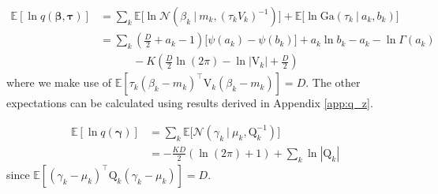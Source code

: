 \documentclass[twoside,11pt]{article}
\newcommand\given[1][]{\:#1\vert\:}
\newcommand{\transpose}[1]{#1^{\intercal}}
\newcommand{\ksum}{\sum_{k}}
\newcommand{\boldbeta}{\boldsymbol\beta}
\newcommand{\boldgamma}{\boldsymbol\gamma}
\newcommand{\boldtau}{\boldsymbol\tau}
\newcommand{\E}{\mathbb{E}}
\begin{document}
\begin{equation} \label{eq:e6_deriv} %
\begin{split}
	\E[\ln q(\boldbeta, \boldtau)] &= \ksum \E \Big[ \ln \mathcal{N} \left( \beta_k \given m_k, (\tau_k V_k)^{-1}\right)\Big] + \E\Big[\ln \mathrm{Ga} \left( \tau_k \given a_k, b_k \right)\Big] \\
	&= \ksum \left( \frac{D}{2} + a_k - 1 \right) \big[\psi(a_k) - \psi(b_k) \big] + a_k \ln b_k - a_k - \ln \Gamma(a_k)\\
	& \quad \quad \quad -K \left( \frac{D}{2} \ln(2\pi) - \ln |\mathrm{V}_{k}| + \frac{D}{2}\right)
\end{split}
\end{equation}
where we make use of $\E[\tau_k \transpose{(\beta_k - m_k)}\mathrm{V}_{k}(\beta_k - m_k)] = D$. The other expectations can be calculated using results derived in Appendix \ref{app:q_z}.

\begin{equation} \label{eq:e7_deriv}
\begin{split}
	\E[\ln q(\boldgamma)] &= \ksum \E \Big[ \mathcal{N} \left( \gamma_k \given \mu_k, \mathrm{Q}_{k}^{-1} \right)\Big] \\
	&= - \frac{KD}{2}(\ln (2\pi) + 1) + \sum_{k} \ln|\mathrm{Q}_k| 
\end{split}
\end{equation}
since $\E[\transpose{(\gamma_k - \mu_k)}\mathrm{Q}_{k}(\gamma_k - \mu_k)] = D$.



\vskip 0.2in
\printbibliography
\end{document}
